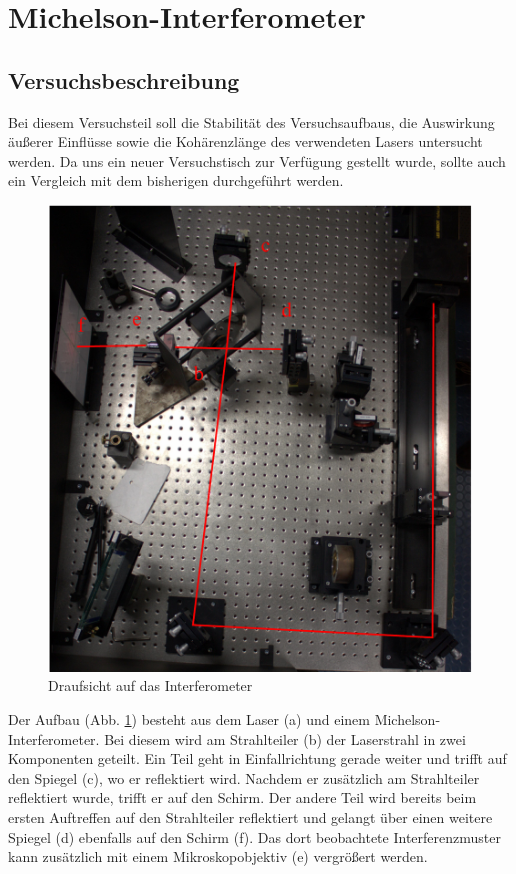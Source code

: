 \section{Michelson-Interferometer}
\subsection{Versuchsbeschreibung}

Bei diesem Versuchsteil soll die Stabilität des Versuchsaufbaus, die Auswirkung äußerer Einflüsse sowie die Kohärenzlänge des verwendeten Lasers untersucht werden. Da uns ein neuer Versuchstisch zur Verfügung gestellt wurde, sollte auch ein Vergleich mit dem bisherigen durchgeführt werden.


\begin{figure}[H]
 \includegraphics[width=\textwidth]{BilderAufbau/Michelson.pdf}
 \caption{Draufsicht auf das Interferometer}
 \label{aufbau_interferometer}
\end{figure}

Der Aufbau (Abb. \ref{aufbau_interferometer}) besteht aus dem Laser (a) und einem Michelson-Interferometer. Bei diesem wird am Strahlteiler (b) der Laserstrahl in zwei Komponenten geteilt. Ein Teil geht in Einfallrichtung gerade weiter und trifft auf den Spiegel (c), wo er reflektiert wird. Nachdem er zusätzlich am Strahlteiler reflektiert wurde, trifft er auf den Schirm. Der andere Teil wird bereits beim ersten Auftreffen auf den Strahlteiler reflektiert und gelangt über einen weitere Spiegel (d) ebenfalls auf den Schirm (f). Das dort beobachtete Interferenzmuster kann zusätzlich mit einem Mikroskopobjektiv (e) vergrößert werden.  

